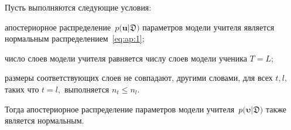 \documentclass[12pt]{a&t}
\begin{document}
\begin{theorem}
\label{theorem:ap:neural}
Пусть выполняются следующие условия:
\begin{enumlist}
\item апостериорное распределение~$p\bigr(\mathbf{u}|\mathfrak{D}\bigr)$ параметров модели учителя является нормальным распределением~\eqref{eq:ap:1};
\item число слоев модели учителя равняется числу слоев модели ученика $T=L$;
\item размеры соответствующих слоев не совпадают, другими словами, для всех $t, l,$ таких что $t=l,$ выполняется $n_t \leq n_l.$
\end{enumlist}

Тогда апостериорное распределение параметров модели учителя~$p\bigr(\bm{\upsilon}|\mathfrak{D}\bigr)$ также является нормальным.
\end{theorem}
\end{document}
